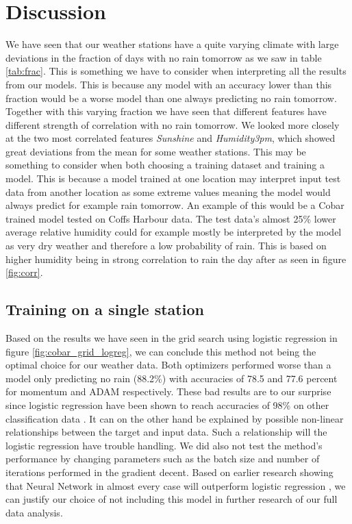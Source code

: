 \documentclass[11pt]{article}
\begin{document}
\section{Discussion}
\label{sec:Discussion}
We have seen that our weather stations have a quite varying climate with large deviations in the fraction of days with no rain tomorrow as we saw in table \ref{tab:frac}. This is something we have to consider when interpreting all the results from our models. This is because any model with an accuracy lower than this fraction would be a worse model than one always predicting no rain tomorrow. Together with this varying fraction we have seen that different features have different strength of correlation with no rain tomorrow. We looked more closely at the two most correlated features \textit{Sunshine} and \textit{Humidity3pm}, which showed great deviations from the mean for some weather stations. This may be something to consider when both choosing a training dataset and training a model. This is because a model trained at one location may interpret input test data from another location as some extreme values meaning the model would always predict for example rain tomorrow. An example of this would be a Cobar trained model tested on Coffs Harbour data. The test data's almost 25\% lower average relative humidity could for example mostly be interpreted by the model as very dry weather and therefore a low probability of rain. This is based on higher humidity being in strong correlation to rain the day after as seen in figure \ref{fig:corr}.

\subsection{Training on a single station} %
\label{sub:Training on a single station}
Based on the results we have seen in the grid search using logistic regression in figure \ref{fig:cobar_grid_logreg}, we can conclude this method not being the optimal choice for our weather data. Both optimizers performed worse than a model only predicting no rain (88.2\%) with accuracies of 78.5 and 77.6 percent for momentum and ADAM respectively. These bad results are to our surprise since logistic regression have been shown to reach accuracies of 98\% on other classification data \cite{project2}. It can on the other hand be explained by possible non-linear relationships between the target and input data. Such a relationship will the logistic regression have trouble handling. We did also not test the method's performance by changing parameters such as the batch size and number of iterations performed in the gradient decent. Based on earlier research showing that Neural Network in almost every case will outperform logistic regression \cite{logreg}, we can justify our choice of not including this model in further research of our full data analysis.
\end{document}
